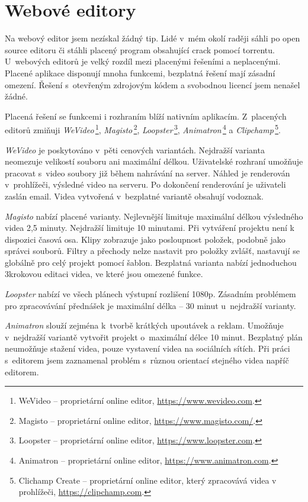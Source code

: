 \section{Webové editory}
Na webový editor jsem nezískal žádný tip. Lidé v~mém okolí raději sáhli po open source editoru či stáhli placený program obsahující crack pomocí torrentu. U~webových editorů je velký rozdíl mezi placenými řešeními a neplacenými. Placené aplikace disponují mnoha funkcemi, bezplatná řešení mají zásadní omezení. Řešení s~otevřeným zdrojovým kódem a svobodnou licencí jsem nenašel žádné.

Placená řešení se funkcemi i rozhraním blíží nativním aplikacím. Z~placených editorů zmiňuji \textit{WeVideo}\,\footnote{WeVideo --  proprietární online editor, \url{https://www.wevideo.com}.}, \textit{Magisto}\,\footnote{Magisto -- proprietární online editor, \url{https://www.magisto.com/}.}, \textit{Loopster}\,\footnote{Loopster -- proprietární online editor, \url{https://www.loopster.com}.}, \textit{Animatron}\,\footnote{Animatron -- proprietární online editor, \url{https://www.animatron.com}.} a \textit{Clipchamp}\,\footnote{Clichamp Create -- proprietární online editor, který zpracovává videa v prohlížeči, \url{https://clipchamp.com}.}.

\textit{WeVideo} je poskytováno v~pěti cenových variantách. Nejdražší varianta neomezuje velikostí souboru ani maximální délkou. Uživatelské rozhraní umožňuje pracovat s~video soubory již během nahrávání na server. Náhled je renderován v~prohlížeči, výsledné video na serveru. Po dokončení renderování je uživateli zaslán email. Videa vytvořená v~bezplatné variantě obsahují vodoznak.

\textit{Magisto} nabízí placené varianty. Nejlevnější limituje maximální délkou výsledného videa 2,5 minuty. Nejdražší limituje 10 minutami. Při vytváření projektu není k dispozici časová osa. Klipy zobrazuje jako posloupnost položek, podobně jako správci souborů. Filtry a přechody nelze nastavit pro položky zvlášť, nastavují se globálně pro celý projekt pomocí šablon. Bezplatná varianta nabízí jednoduchou 3krokovou editaci videa, ve které jsou omezené funkce.

\textit{Loopster} nabízí ve všech plánech výstupní rozlišení 1080p. Zásadním problémem pro zpracovávání přednášek je maximální délka -- 30 minut u~nejdražší varianty.

\textit{Animatron} slouží zejména k~tvorbě krátkých upoutávek a reklam. Umožňuje v~nejdražší variantě vytvořit projekt o~maximální délce 10 minut. Bezplatný plán neumožňuje stažení videa, pouze vystavení videa na sociálních sítích. Při práci s~editorem jsem zaznamenal problém s~různou orientací stejného videa napříč editorem.

